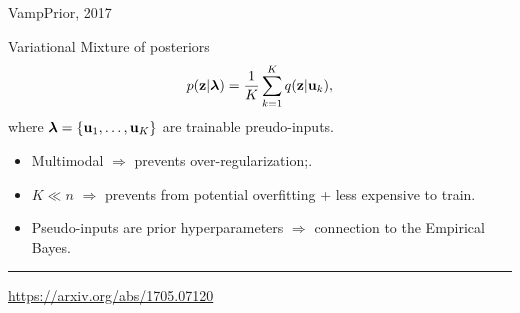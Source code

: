 \begin{frame}{VampPrior, 2017}
	\begin{block}{Variational Mixture of posteriors}
		\[
		p(\mathbf{z} | \boldsymbol{\lambda}) = \frac{1}{K} \sum_{k=1}^K q(\mathbf{z} | \mathbf{u}_k),
		\]
		where $\boldsymbol{\lambda} = \{\mathbf{u}_1, \dots, \mathbf{u}_K\}$ are trainable preudo-inputs.
	\end{block}
	\begin{itemize}
		\item Multimodal $\Rightarrow$ prevents over-regularization;.
		\item $K \ll n$ $\Rightarrow$ prevents from potential overfitting + less expensive to train.
		\item Pseudo-inputs are prior hyperparameters $\Rightarrow$ connection to the Empirical Bayes.
	\end{itemize}
	\vfill
	\hrule\medskip
	{\scriptsize \href{https://arxiv.org/abs/1705.07120}{https://arxiv.org/abs/1705.07120}}
\end{frame}
